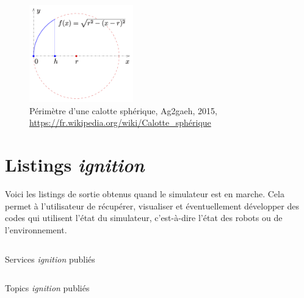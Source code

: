 		\begin{figure}[H]
			\centering
			\includegraphics[width=0.4\textwidth]{imgs/calotte_spherique.png}
			\caption{Périmètre d'une calotte sphérique, Ag2gaeh, 2015, \url{https://fr.wikipedia.org/wiki/Calotte_sphérique}}
			\label{fig:calotte_spherique}
		\end{figure}

	\section{Listings \textit{ignition}}

		Voici les listings de sortie obtenus quand le simulateur est en marche. Cela permet à l'utilisateur de récupérer, visualiser et éventuellement développer des codes qui utilisent l'état du simulateur, c'est-à-dire l'état des robots ou de l'environnement.

		\begin{listing}[!htb]
			\inputminted{shell}{./listings/ign_services.log}
			\caption{Services \textit{ignition} publiés}
			\label{listing:ign_services}
		\end{listing}

		\begin{listing}[!htb]
			\inputminted{shell}{./listings/ign_topics.log}
			\caption{Topics \textit{ignition} publiés}
			\label{listing:ign_topics}
		\end{listing}
		